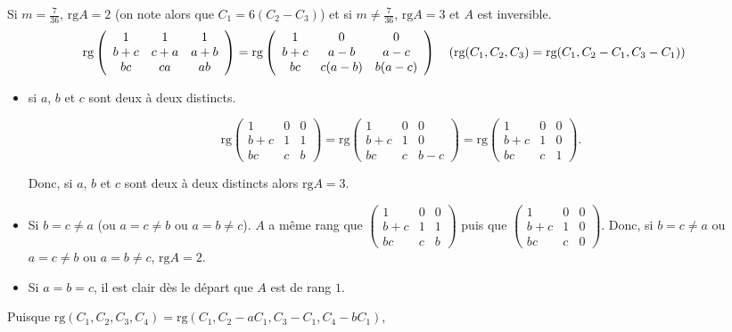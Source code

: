 {{Si $m=\frac{7}{36}$, $\mbox{rg}A=2$ (on note alors que $C_1=6(C_2-C_3)$) et si $m\neq\frac{7}{36}$, $\mbox{rg}A=3$ et $A$ est inversible.
\begin{align*}\ensuremath
\mbox{rg}\left(
\begin{array}{ccc}
1&1&1\\
b+c&c+a&a+b\\
bc&ca&ab
\end{array}
\right)&=\mbox{rg}\left(
\begin{array}{ccc}
1&0&0\\
b+c&a-b&a-c\\
bc&c(a-b)&b(a-c)
\end{array}
\right)\quad(\mbox{rg}(C_1,C_2,C_3)=\mbox{rg}(C_1,C_2-C_1,C_3-C_1))
\end{align*}

\begin{itemize}
\item[1er cas.] si $a$, $b$ et $c$ sont deux à deux distincts. 

$$\mbox{rg}\left(
\begin{array}{ccc}
1&0&0\\
b+c&1&1\\
bc&c&b
\end{array}
\right)=\mbox{rg}\left(
\begin{array}{ccc}
1&0&0\\
b+c&1&0\\
bc&c&b-c
\end{array}
\right)=\mbox{rg}\left(
\begin{array}{ccc}
1&0&0\\
b+c&1&0\\
bc&c&1
\end{array}
\right).$$

Donc, si $a$, $b$ et $c$ sont deux à deux distincts alors $\mbox{rg}A=3$.
\item[2ème cas.] Si $b=c\neq a$ (ou $a=c\neq b$ ou $a=b\neq c$).
$A$ a même rang que $\left(
\begin{array}{ccc}
1&0&0\\
b+c&1&1\\
bc&c&b
\end{array}
\right)$ puis que $\left(
\begin{array}{ccc}
1&0&0\\
b+c&1&0\\
bc&c&0
\end{array}
\right)$. Donc, si $b=c\neq a$ ou $a=c\neq b$ ou $a=b\neq c$, $\mbox{rg}A=2$.
\item[3ème cas.] Si $a=b=c$, il est clair dès le départ que $A$ est de rang $1$.
\end{itemize}
Puisque $\mbox{rg}(C_1,C_2,C_3,C_4)=\mbox{rg}(C_1,C_2-aC_1,C_3-C_1,C_4-bC_1)$,

}}
